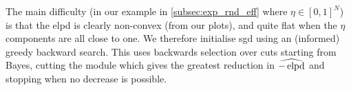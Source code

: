 The main difficulty (in our example in \cref{subsec:exp_rnd_eff} where $\eta\in [0,1]^{N}$) is that the \acrshort{elpd} is clearly non-convex (from our plots), and quite flat when the $\eta$ components are all close to one. We therefore initialise \acrshort*{sgd} using an (informed) greedy backward search. This uses backwards selection over cuts starting from Bayes, cutting the module which gives the greatest reduction in $\widehat {-\operatorname{\text{elpd}}}$ and stopping when no decrease is possible. 











